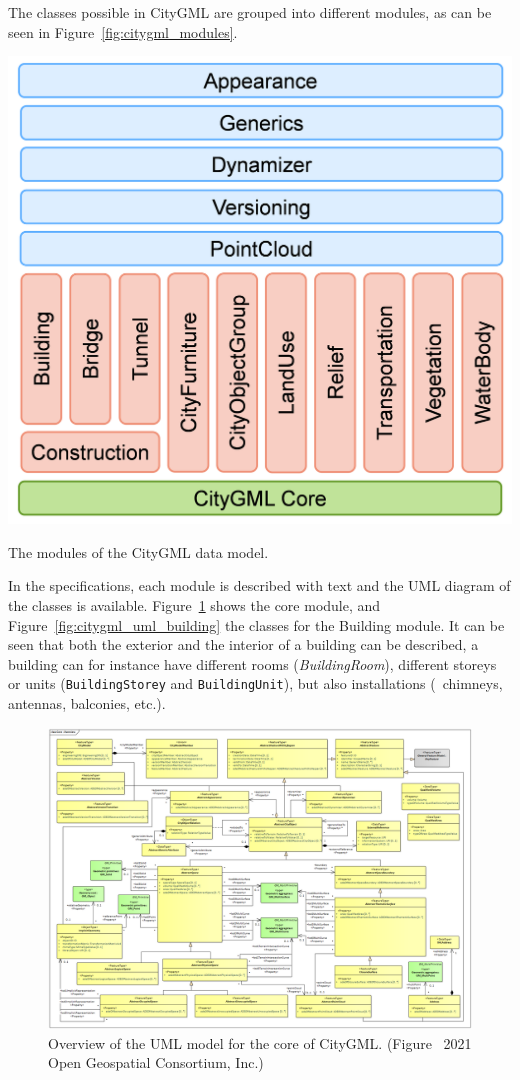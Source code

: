 The classes possible in CityGML are grouped into different modules, as can be seen in Figure~\ref{fig:citygml_modules}.
\begin{marginfigure}
  \centering
  \includegraphics[width=\linewidth]{figs/citygml_modules.png}
  \caption{The modules of the CityGML data model.}%
\label{fig:citygml_modules}
\end{marginfigure}
In the specifications, each module is described with text and the UML diagram of the classes is available.
Figure~\ref{fig:citygml_uml_core} shows the core module, and Figure~\ref{fig:citygml_uml_building} the classes for the Building module.
It can be seen that both the exterior and the interior of a building can be described, a building can for instance have different rooms (\emph{BuildingRoom}), different storeys or units (\texttt{BuildingStorey} and \texttt{BuildingUnit}), but also installations (\eg\ chimneys, antennas, balconies, etc.).
\begin{figure}
  \centering
  \includegraphics[width=0.95\linewidth]{figs/citygml_uml_core}
  \caption[Overview of the UML model for the core of CityGML]{Overview of the UML model for the core of CityGML\@. (Figure \textcopyright\ 2021 Open Geospatial Consortium, Inc.)}%
\label{fig:citygml_uml_core}
\end{figure}

